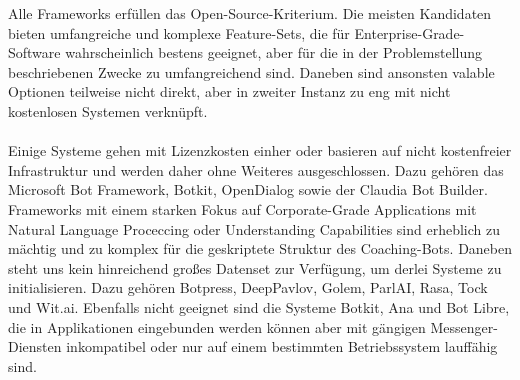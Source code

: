         Alle Frameworks erfüllen das Open-Source-Kriterium. Die meisten Kandidaten bieten umfangreiche und komplexe Feature-Sets, die für Enterprise-Grade-Software wahrscheinlich bestens geeignet, aber für die in der Problemstellung beschriebenen Zwecke zu umfangreichend sind. Daneben sind ansonsten valable Optionen teilweise nicht direkt, aber in zweiter Instanz zu eng mit nicht kostenlosen Systemen verknüpft.\\ \\
        Einige Systeme gehen mit Lizenzkosten einher oder basieren auf nicht kostenfreier Infrastruktur und werden daher ohne Weiteres ausgeschlossen. Dazu gehören das Microsoft Bot Framework, Botkit, OpenDialog sowie der Claudia Bot Builder. Frameworks mit einem starken Fokus auf Corporate-Grade Applications mit Natural Language Proceccing oder Understanding Capabilities sind erheblich zu mächtig und zu komplex für die geskriptete Struktur des Coaching-Bots. Daneben steht uns kein hinreichend großes Datenset zur Verfügung, um derlei Systeme zu initialisieren. Dazu gehören Botpress, DeepPavlov, Golem, ParlAI, Rasa, Tock und Wit.ai. Ebenfalls nicht geeignet sind die Systeme Botkit, Ana und Bot Libre, die in Applikationen eingebunden werden können aber mit gängigen Messenger-Diensten inkompatibel oder nur auf einem bestimmten Betriebssystem lauffähig sind.
    
